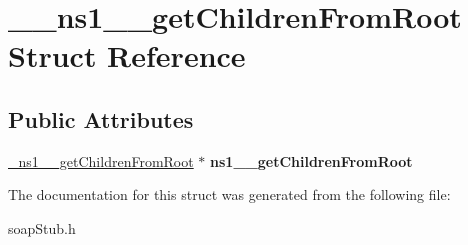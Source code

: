 \hypertarget{struct____ns1____getChildrenFromRoot}{
\section{\_\-\_\-ns1\_\-\_\-getChildrenFromRoot Struct Reference}
\label{struct____ns1____getChildrenFromRoot}
}
\subsection*{Public Attributes}
\begin{DoxyCompactItemize}
\item 
\hypertarget{struct____ns1____getChildrenFromRoot_abed96fa6e969bc35efbbc2ca34e42f92}{
\hyperlink{class__ns1____getChildrenFromRoot}{\_\-ns1\_\-\_\-getChildrenFromRoot} $\ast$ {\bfseries ns1\_\-\_\-getChildrenFromRoot}}
\label{struct____ns1____getChildrenFromRoot_abed96fa6e969bc35efbbc2ca34e42f92}

\end{DoxyCompactItemize}


The documentation for this struct was generated from the following file:\begin{DoxyCompactItemize}
\item 
soapStub.h\end{DoxyCompactItemize}
